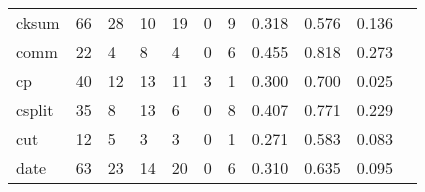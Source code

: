 \begin{longtable}{lp{1.20cm}p{1.20cm}p{1.20cm}p{1.20cm}p{1.20cm}p{1.20cm}p{1.20cm}p{1.20cm}p{1.20cm}p{1.20cm}}
cksum     &                                    66 &                                                 28 &                                                 10 &                                                 19 &                                                  0 &                                                  9 &                                         0.318 &                                              0.576 &                                              0.136 \\
comm      &                                    22 &                                                  4 &                                                  8 &                                                  4 &                                                  0 &                                                  6 &                                         0.455 &                                              0.818 &                                              0.273 \\
cp        &                                    40 &                                                 12 &                                                 13 &                                                 11 &                                                  3 &                                                  1 &                                         0.300 &                                              0.700 &                                              0.025 \\
csplit    &                                    35 &                                                  8 &                                                 13 &                                                  6 &                                                  0 &                                                  8 &                                         0.407 &                                              0.771 &                                              0.229 \\
cut       &                                    12 &                                                  5 &                                                  3 &                                                  3 &                                                  0 &                                                  1 &                                         0.271 &                                              0.583 &                                              0.083 \\
date      &                                    63 &                                                 23 &                                                 14 &                                                 20 &                                                  0 &                                                  6 &                                         0.310 &                                              0.635 &                                              0.095 \\

\end{longtable}

